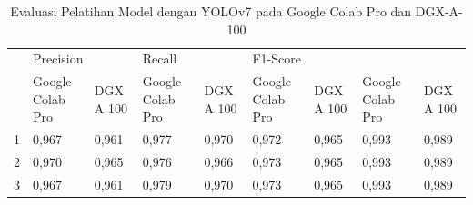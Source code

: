 \begin{singlespace}
	\begin{table}[H]
		\centering
		\caption{Evaluasi Pelatihan Model dengan YOLOv7 pada Google Colab Pro dan DGX-A-100}
		\label{tbl:Evaluasi-Pelatihan-Model-Dengan-YOLOv7}
		\begin{tabular}{|p{1cm}|p{1cm}p{1cm}|p{1cm}p{1cm}|p{1cm}p{1cm}|p{1cm}p{1cm}|}
			\hline
			\rowcolor[HTML]{D9D9D9} 
			\cellcolor[HTML]{D9D9D9}                       & \multicolumn{2}{p{1cm}|}{\cellcolor[HTML]{D9D9D9}Precision}                    & \multicolumn{2}{p{1cm}|}{\cellcolor[HTML]{D9D9D9}Recall}                       & \multicolumn{2}{p{1cm}|}{\cellcolor[HTML]{D9D9D9}F1-Score}                     & \multicolumn{2}{p{1cm}|}{\cellcolor[HTML]{BFBFBF}{\color[HTML]{333333} mAP@.5}} \\ \cline{2-9} 
			\rowcolor[HTML]{D9D9D9} 
			\multirow{-2}{*}{\cellcolor[HTML]{D9D9D9}Fold} & \multicolumn{1}{p{1cm}|}{\cellcolor[HTML]{D9D9D9}Google Colab Pro} & DGX A 100 & \multicolumn{1}{p{1cm}|}{\cellcolor[HTML]{D9D9D9}Google Colab Pro} & DGX A 100 & \multicolumn{1}{p{1cm}|}{\cellcolor[HTML]{D9D9D9}Google Colab Pro} & DGX A 100 & \multicolumn{1}{p{1cm}|}{\cellcolor[HTML]{D9D9D9}Google Colab Pro}  & DGX A 100 \\ \hline
			
			1                                              & \multicolumn{1}{p{1cm}|}{0,967}                                    & 0,961     & \multicolumn{1}{p{1cm}|}{0,977}                                    & 0,970     & \multicolumn{1}{p{1cm}|}{0,972}                                    & 0,965     & \multicolumn{1}{p{1cm}|}{0,993}                                     & 0,989     \\ \hline
			
			2                                              & \multicolumn{1}{p{1cm}|}{0,970}                                    & 0,965     & \multicolumn{1}{p{1cm}|}{0,976}                                    & 0,966     & \multicolumn{1}{p{1cm}|}{0,973}                                    & 0,965     & \multicolumn{1}{p{1cm}|}{0,993}                                     & 0,989     \\ \hline
			
			3                                              & \multicolumn{1}{p{1cm}|}{0,967}                                    & 0,961     & \multicolumn{1}{p{1cm}|}{0,979}                                    & 0,970     & \multicolumn{1}{p{1cm}|}{0,973}                                    & 0,965     & \multicolumn{1}{p{1cm}|}{0,993}                                     & 0,989     \\ \hline
			

\end{tabular}
\end{table}
\end{singlespace}
